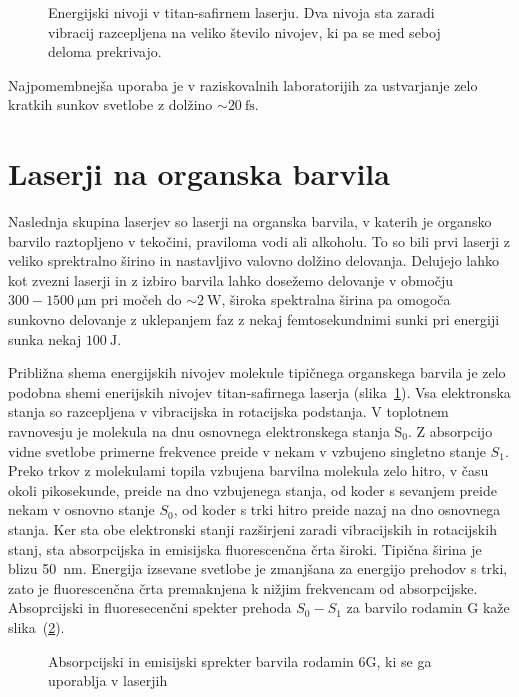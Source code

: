 \begin{figure}[h]
\centering
\def\svgwidth{90truemm} 

\caption{Energijski nivoji v titan-safirnem laserju. Dva nivoja sta zaradi vibracij
razcepljena na veliko število nivojev, ki pa se med seboj deloma prekrivajo.
}
\label{fig:TiE}
\end{figure} 

Najpomembnejša uporaba je v raziskovalnih laboratorijih za ustvarjanje zelo kratkih sunkov svetlobe
z dolžino $\sim 20~\si{\femto\second}$.

\section{Laserji na organska barvila}
Naslednja skupina laserjev so laserji na organska barvila, v katerih
je organsko barvilo raztopljeno v tekočini, praviloma vodi ali alkoholu. 
To so bili prvi laserji z veliko sprektralno širino in nastavljivo valovno dolžino
delovanja. Delujejo lahko kot zvezni laserji in z izbiro barvila lahko dosežemo
delovanje v območju $300-1500~\si{\micro\metre}$ pri močeh do $\sim 2~\si{\watt}$, 
široka spektralna širina pa omogoča sunkovno delovanje z uklepanjem faz 
z nekaj femtosekundnimi sunki pri energiji sunka nekaj $100~\si{\joule}$.

Približna shema energijskih nivojev molekule tipičnega organskega barvila
je zelo podobna shemi enerijskih nivojev titan-safirnega laserja (slika~\ref{fig:TiE}).
Vsa elektronska stanja so razcepljena v vibracijska in rotacijska podstanja. 
V toplotnem ravnovesju je molekula na dnu osnovnega elektronskega stanja S$_0$. 
Z absorpcijo vidne svetlobe primerne frekvence preide v nekam v vzbujeno
singletno stanje $S_1$. Preko trkov z molekulami topila vzbujena barvilna molekula
zelo hitro, v času okoli pikosekunde, preide na dno vzbujenega stanja, od
koder s sevanjem preide nekam v osnovno stanje $S_0$, od koder s trki
hitro preide nazaj na dno osnovnega stanja. Ker
sta obe elektronski stanji razširjeni zaradi vibracijskih in rotacijskih
stanj, sta absorpcijska in emisijska fluorescenčna črta široki. Tipična
širina je blizu 50~nm. Energija izsevane svetlobe je zmanjšana za energijo
prehodov s trki, zato je fluorescenčna črta premaknjena k nižjim
frekvencam od absorpcijske. Absoprcijski in fluoresecenčni spekter prehoda $S_0-S_1$
za barvilo rodamin G kaže slika~(\ref{fig:RhG}).

\begin{figure}[h]
\centering
\def\svgwidth{90truemm} 
%
\caption{Absorpcijski in emisijski sprekter barvila rodamin 6G, ki se ga uporablja
v laserjih
}
\label{fig:RhG}
\end{figure} 

